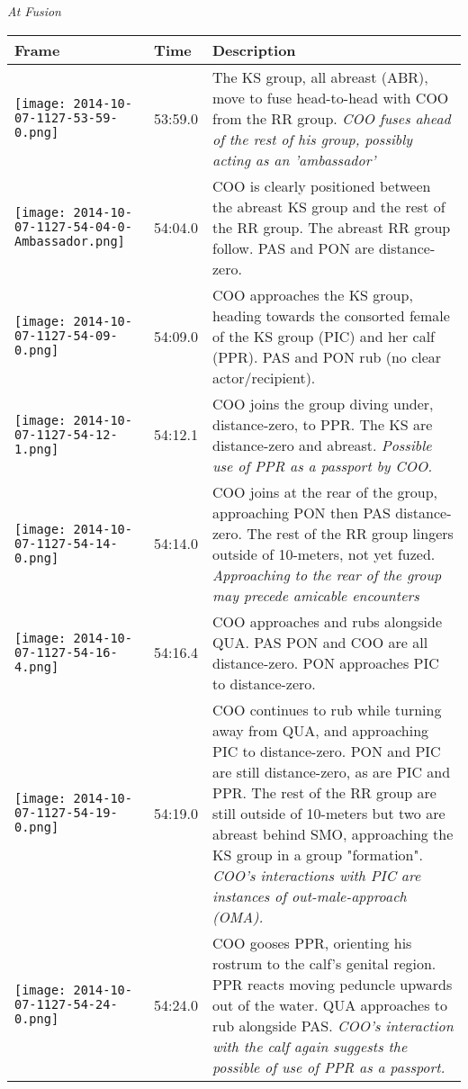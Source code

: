 \documentclass[11pt]{amsart}
\begin{document}
\noindent \textit{At Fusion}
\begin{longtable}{| m{} | m{} | m{} |}
\hline
Frame & Time & Description \\ \hline
\texttt{[image: 2014-10-07-1127-53-59-0.png]} & 53:59.0 &  The KS group, all abreast (ABR), move to fuse head-to-head with COO from the RR group. \textit{COO fuses ahead of the rest of his group, possibly acting as an 'ambassador'} \\ \hline
\texttt{[image: 2014-10-07-1127-54-04-0-Ambassador.png]} & 54:04.0 & COO is clearly positioned between the abreast KS group and the rest of the RR group. The abreast RR group follow. PAS and PON are distance-zero. \\ \hline
\texttt{[image: 2014-10-07-1127-54-09-0.png]} & 54:09.0 & COO approaches the KS group, heading towards the consorted female of the KS group (PIC) and her calf (PPR). PAS and PON rub (no clear actor/recipient). \\ \hline
\texttt{[image: 2014-10-07-1127-54-12-1.png]} & 54:12.1 & COO joins the group diving under, distance-zero, to PPR. The KS are distance-zero and abreast. \textit{Possible use of PPR as a passport by COO.} \\ \hline
\texttt{[image: 2014-10-07-1127-54-14-0.png]} & 54:14.0 &  COO joins at the rear of the group, approaching PON then PAS distance-zero. The rest of the RR group lingers outside of 10-meters, not yet fuzed. \textit{Approaching to the rear of the group may precede amicable encounters} \\ \hline
\texttt{[image: 2014-10-07-1127-54-16-4.png]} & 54:16.4 &  COO approaches and rubs alongside QUA. PAS PON and COO are all distance-zero. PON approaches PIC to distance-zero. \\ \hline
\texttt{[image: 2014-10-07-1127-54-19-0.png]} & 54:19.0 &  COO continues to rub while turning away from QUA, and approaching PIC to distance-zero. PON and PIC are still distance-zero, as are PIC and PPR. The rest of the RR group are still outside of 10-meters but two are abreast behind SMO, approaching the KS group in a group "formation". \textit{COO's interactions with PIC are instances of out-male-approach (OMA).} \\ \hline
\texttt{[image: 2014-10-07-1127-54-24-0.png]} & 54:24.0 & COO gooses PPR, orienting his rostrum to the calf's genital region. PPR reacts moving peduncle upwards out of the water. QUA approaches to rub alongside PAS. \textit{COO's interaction with the calf again suggests the possible of use of PPR as a passport.} \\ \hline

\end{longtable}
\end{document}
